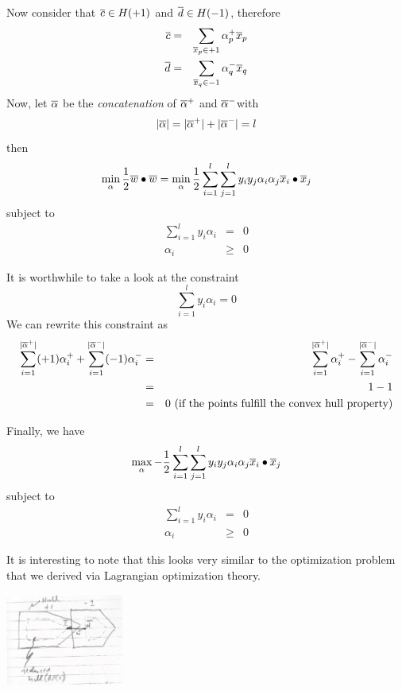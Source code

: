 \documentclass[a4paper,blends,pdf,colorBG,slideColor]{prosper}
\begin{document}
Now consider that $\overline{c}\in H(+1)$ and $\overline{d}\in H(-1)$, therefore
\begin{eqnarray*}
\overline{c} &=& \sum_{\overline{x}_p \in +1} \alpha_p^+ \overline{x}_p\\
\overline{d} &=& \sum_{\overline{x}_q \in -1} \alpha_q^- \overline{x}_q
\end{eqnarray*}
Now, let $\overline{\alpha}$ be the {\em concatenation} of $\overline{\alpha}^+$ and $\overline{\alpha}^-$with
\[
|\overline{\alpha}| = |\overline{\alpha}^+| + |\overline{\alpha}^-| = l
\]
then
\[
\min_\alpha \frac{1}{2} \overline{w}\bullet\overline{w} = \min_\alpha \frac{1}{2} \sum_{i=1}^l\sum_{j=1}^l y_i y_j \alpha_i \alpha_j \overline{x}_i \bullet \overline{x}_j
\]
subject to 
\begin{eqnarray*}
\sum_{i=1}^{l} y_i \alpha_i &=& 0 \\
\alpha_i &\ge& 0
\end{eqnarray*}

\es


It is worthwhile to take a look at the constraint
\[
\sum_{i=1}^{l} y_i \alpha_i = 0
\]
We can rewrite this constraint as
\begin{eqnarray*}
 \sum_{i=1}^{|\overline{\alpha}^+|} (+1) \alpha_i^+ + \sum_{i=1}^{ |\overline{\alpha}^-|} (-1) \alpha_i^- &=& 
 		 \sum_{i=1}^{|\overline{\alpha}^+|}  \alpha_i^+ - \sum_{i=1}^{ |\overline{\alpha}^-|}  \alpha_i^-\\
	&=&	1 - 1\\
	&=& 0 \mbox{  (if the points fulfill the convex hull property)}
 \end{eqnarray*}

\es
{}

Finally, we have
\[
\max_\alpha - \frac{1}{2}\sum_{i=1}^l\sum_{j=1}^l y_i y_j \alpha_i \alpha_j \overline{x}_i \bullet \overline{x}_j
\]
subject to 
\begin{eqnarray*}
\sum_{i=1}^{l} y_i \alpha_i &=& 0\\
\alpha_i &\ge& 0
\end{eqnarray*}

It is interesting to note that this looks very similar to the optimization problem that we derived via Lagrangian optimization theory.
\es

\begin{center}
\includegraphics[height=30mm]{images/hull-3.eps}
\end{center}
\end{document}
